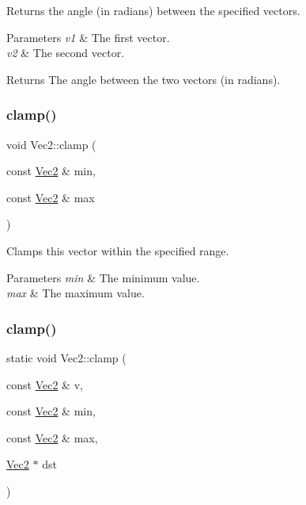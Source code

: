 Returns the angle (in radians) between the specified vectors.


\begin{DoxyParams}{Parameters}
{\em v1} & The first vector. \\
\hline
{\em v2} & The second vector.\\
\hline
\end{DoxyParams}
\begin{DoxyReturn}{Returns}
The angle between the two vectors (in radians). 
\end{DoxyReturn}
\mbox{\label{classVec2_a5c3444068aab183f97eb5081b817748a}} 
\subsubsection{\texorpdfstring{clamp()}{clamp()}\hspace{0.1cm}{\footnotesize\ttfamily [1/4]}}
{\footnotesize\ttfamily void Vec2\+::clamp (\begin{DoxyParamCaption}\item[{const \hyperlink{classVec2}{Vec2} \&}]{min,  }\item[{const \hyperlink{classVec2}{Vec2} \&}]{max }\end{DoxyParamCaption})}

Clamps this vector within the specified range.


\begin{DoxyParams}{Parameters}
{\em min} & The minimum value. \\
\hline
{\em max} & The maximum value. \\
\hline
\end{DoxyParams}
\mbox{\label{classVec2_a6ac327ca40c0457b85fb9ee3c1a6e1fa}} 
\subsubsection{\texorpdfstring{clamp()}{clamp()}\hspace{0.1cm}{\footnotesize\ttfamily [2/4]}}
{\footnotesize\ttfamily static void Vec2\+::clamp (\begin{DoxyParamCaption}\item[{const \hyperlink{classVec2}{Vec2} \&}]{v,  }\item[{const \hyperlink{classVec2}{Vec2} \&}]{min,  }\item[{const \hyperlink{classVec2}{Vec2} \&}]{max,  }\item[{\hyperlink{classVec2}{Vec2} $\ast$}]{dst }\end{DoxyParamCaption})\hspace{0.3cm}{\ttfamily [static]}}

